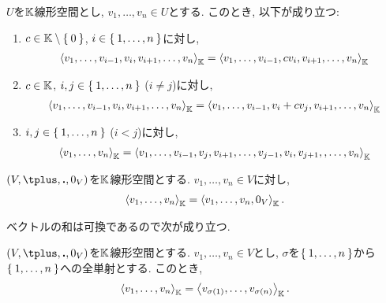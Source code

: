 \begin{lemma}
  $U$を$\mathbb{K}$線形空間とし,
  $v_1,\ldots,v_n\in U$とする.
  このとき, 以下が成り立つ:
  \begin{enumerate}
  \item
    $c\in \mathbb{K}\setminus\Set{0}$, $i\in\Set{1,\ldots,n}$に対し,
    \begin{align*}
      \Braket{v_1,\ldots,v_{i-1},v_{i},v_{i+1},\ldots,v_n}_{\mathbb{K}}=
      \Braket{v_1,\ldots,v_{i-1},cv_{i},v_{i+1},\ldots,v_n}_{\mathbb{K}}
    \end{align*}
  \item
    $c\in \mathbb{K}$, $i,j\in\Set{1,\ldots,n}$ ($i\neq j$)に対し,
    \begin{align*}
      \Braket{v_1,\ldots,v_{i-1},v_{i},v_{i+1},\ldots,v_n}_{\mathbb{K}}=
      \Braket{v_1,\ldots,v_{i-1},v_i+cv_{j},v_{i+1},\ldots,v_n}_{\mathbb{K}}
    \end{align*}
  \item
    $i,j\in\Set{1,\ldots,n}$ ($i< j$)に対し,
    \begin{align*}
      \Braket{v_1,\ldots,v_n}_{\mathbb{K}}=
      \Braket{v_1,\ldots,v_{i-1},v_j,v_{i+1},\ldots,v_{j-1},v_i,v_{j+1},,\ldots,v_n}_{\mathbb{K}}
    \end{align*}
  \end{enumerate}
\end{lemma}

\begin{lemma}
  $(V,\plus,\act,0_V)$を$\mathbb{K}$線形空間とする.
  $v_1,\ldots,v_n\in V$に対し,
    \begin{align*}
      \Braket{v_1,\ldots,v_n}_{\mathbb{K}}=
      \Braket{v_1,\ldots,v_n,0_V}_{\mathbb{K}}.
    \end{align*}
\end{lemma}

ベクトルの和は可換であるので次が成り立つ.
\begin{lemma}
  $(V,\plus,\act,0_V)$を$\mathbb{K}$線形空間とする.
  $v_1,\ldots,v_n\in V$とし,
  $\sigma$を$\Set{1,\ldots,n}$から$\Set{1,\ldots,n}$への全単射とする.
  このとき,
    \begin{align*}
      \Braket{v_1,\ldots,v_n}_{\mathbb{K}}=
      \Braket{v_{\sigma(1)},\ldots,v_{\sigma(n)}}_{\mathbb{K}}.
    \end{align*}
\end{lemma}

